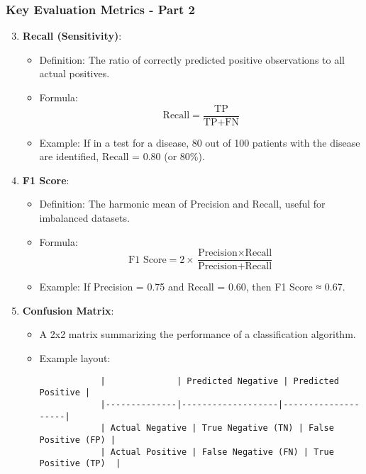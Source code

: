 \documentclass[aspectratio=169]{beamer}
\begin{document}
\begin{frame}[fragile]
    \frametitle{Key Evaluation Metrics - Part 2}
    \begin{enumerate}
        \setcounter{enumi}{2} %
        \item \textbf{Recall (Sensitivity)}:
        \begin{itemize}
            \item Definition: The ratio of correctly predicted positive observations to all actual positives.
            \item Formula: 
            \begin{equation}
            \text{Recall} = \frac{\text{TP}}{\text{TP} + \text{FN}}
            \end{equation}
            \item Example: If in a test for a disease, 80 out of 100 patients with the disease are identified, Recall = 0.80 (or 80\%).
        \end{itemize}

        \item \textbf{F1 Score}:
        \begin{itemize}
            \item Definition: The harmonic mean of Precision and Recall, useful for imbalanced datasets.
            \item Formula: 
            \begin{equation}
            \text{F1 Score} = 2 \times \frac{\text{Precision} \times \text{Recall}}{\text{Precision} + \text{Recall}}
            \end{equation}
            \item Example: If Precision = 0.75 and Recall = 0.60, then F1 Score ≈ 0.67.
        \end{itemize}
        
        \item \textbf{Confusion Matrix}:
        \begin{itemize}
            \item A 2x2 matrix summarizing the performance of a classification algorithm.
            \item Example layout:
            \begin{verbatim}
            |              | Predicted Negative | Predicted Positive |
            |--------------|-------------------|--------------------|
            | Actual Negative | True Negative (TN) | False Positive (FP) |
            | Actual Positive | False Negative (FN) | True Positive (TP)  |
            \end{verbatim}
        \end{itemize}
    \end{enumerate}
\end{frame}
\end{document}
